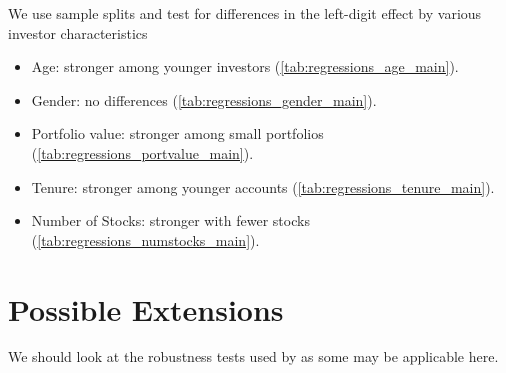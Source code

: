 We use sample splits and test for differences in the left-digit effect by various investor characteristics
\begin{itemize}
	\item Age: stronger among younger investors (\ref{tab:regressions_age_main}).
	\item Gender: no differences (\ref{tab:regressions_gender_main}).
	\item Portfolio value: stronger among small portfolios (\ref{tab:regressions_portvalue_main}).
	\item Tenure: stronger among younger accounts (\ref{tab:regressions_tenure_main}).
	\item Number of Stocks: stronger with fewer stocks (\ref{tab:regressions_numstocks_main}).
\end{itemize}

\section{Possible Extensions}

We should look at the robustness tests used by \cite{hartzmark2015} as some may be applicable here.






